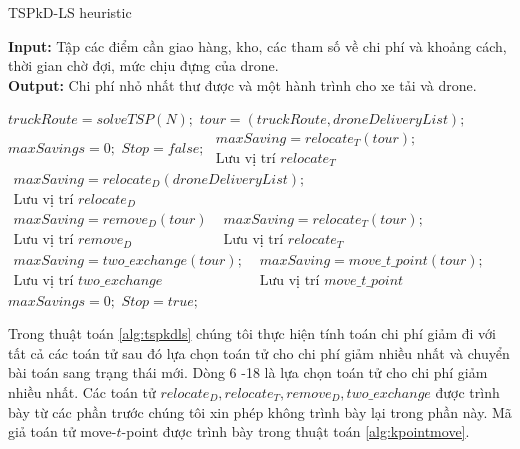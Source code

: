 \documentclass[a4paper,12pt]{report}
\begin{document}
\begin{algorithm}[H]
\caption{TSPkD-LS heuristic}
\textbf{Input:} Tập các điểm cần giao hàng, kho, các tham số về chi phí và khoảng cách, thời gian chờ đợi, mức chịu đựng của drone.\\
\textbf{Output:} Chi phí nhỏ nhất thư được và một hành trình cho xe tải và drone.
\begin{algorithmic}[1]
\State $truckRoute = solveTSP(N);$
\State $tour = (truckRoute, droneDeliveryList);$
\State $maxSavings = 0;$
\State $Stop = false;$
\Repeat
{}
\State $\begin{array}{l}
maxSaving=relocate_T(tour); \\
\text{Lưu vị trí } relocate_T
\end{array}$
\State $\begin{array}{l}
maxSaving=relocate_D(droneDeliveryList); \\
\text{Lưu vị trí } relocate_D
\end{array}$
\State $\begin{array}{l}
maxSaving=remove_D(tour) \\
\text{Lưu vị trí } remove_D
\end{array}$
\State $\begin{array}{l}
maxSaving=relocate_T(tour); \\
\text{Lưu vị trí } relocate_T
\end{array}$
\State $\begin{array}{l}
maxSaving=two\_exchange(tour); \\
\text{Lưu vị trí } two\_exchange
\end{array}$
\State $\begin{array}{l}
maxSaving=move\_t\_point(tour); \\
\text{Lưu vị trí } move\_t\_point
\end{array}$
\EndIf
{} 
\State $maxSavings=0;$
\Else 
\State $Stop=true;$
\EndIf

\end{algorithmic}
\label{alg:tspkdls}
\end{algorithm}
Trong thuật toán \ref{alg:tspkdls} chúng tôi thực hiện tính toán chi phí giảm đi với tất cả các toán tử sau đó lựa chọn toán tử cho chi phí giảm nhiều nhất và chuyển bài toán sang trạng thái mới. Dòng 6 -18 là lựa chọn toán tử cho chi phí giảm nhiều nhất. Các toán tử $relocate_D, relocate_T, remove_D, two\_exchange$ được trình bày từ các phần trước chúng tôi xin phép không trình bày lại trong phần này. Mã giả toán tử move-$t$-point được trình bày trong thuật toán \ref{alg:kpointmove}.
\end{document}
